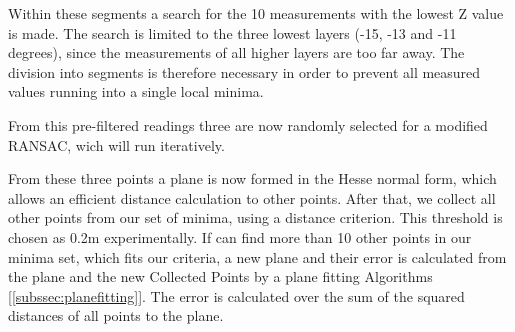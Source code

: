 \documentclass[11pt,oneside,openright]{mpreport}
\begin{document}



Within these segments a search for the 10 measurements with the lowest Z value is made. The search is limited to the three lowest layers (-15, -13 and -11 degrees),
since the measurements of all higher layers are too far away. The division into segments is therefore necessary in order to prevent all measured values running into a single local minima. 


From this pre-filtered readings three are now randomly selected for a modified \ac{RANSAC}, wich will run iteratively.

From these three points a plane is now formed in the Hesse normal form, which allows an efficient distance calculation to other points.
After that, we collect all other points from our set of minima, using a distance criterion. This threshold is chosen as 0.2m experimentally.
If can find more than 10 other points in our minima set, which fits our criteria, a new plane and their error is calculated from the plane and
the new Collected Points by a plane fitting Algorithms [\cref{subssec:planefitting}].
The error is calculated over the sum of the squared distances of all points to the plane.
\end{document}
